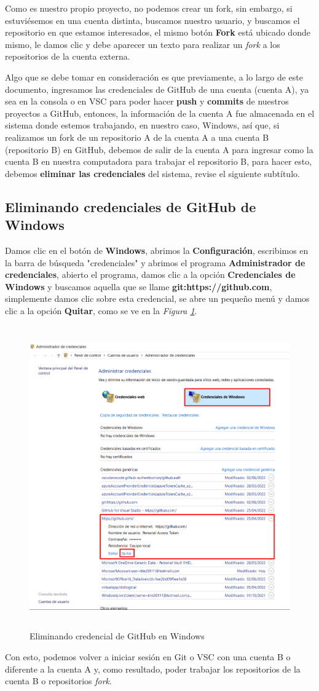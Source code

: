 Como es nuestro propio proyecto, no podemos crear un fork, sin embargo, si estuviésemos en una cuenta distinta, buscamos nuestro usuario, y buscamos el repositorio en que estamos interesados, el mismo botón \textbf{Fork} está ubicado donde mismo, le damos clic y debe aparecer un texto para realizar un \textit{fork} a los repositorios de la cuenta externa.

Algo que se debe tomar en consideración es que previamente, a lo largo de este documento, ingresamos las credenciales de GitHub de una cuenta (cuenta A), ya sea en la consola o en VSC para poder hacer \textbf{push} y \textbf{commits} de nuestros proyectos a GitHub, entonces, la información de la cuenta A fue almacenada en el sistema donde estemos trabajando, en nuestro caso, Windows, así que, si realizamos un fork de un repositorio A de la cuenta A a una cuenta B (repositorio B) en GitHub, debemos de salir de la cuenta A para ingresar como la cuenta B en nuestra computadora para trabajar el repositorio B, para hacer esto, debemos \textbf{eliminar las credenciales} del sistema, revise el siguiente subtítulo.


\subsection{Eliminando credenciales de GitHub de Windows}

Damos clic en el botón de \textbf{Windows}, abrimos la \textbf{Configuración}, escribimos en la barra de búsqueda "credenciales" y abrimos el programa \textbf{Administrador de credenciales}, abierto el programa, damos clic a la opción \textbf{Credenciales de Windows} y buscamos aquella que se llame \textbf{git:https://github.com}, simplemente damos clic sobre esta credencial, se abre un pequeño menú y damos clic a la opción \textbf{Quitar}, como se ve en la \textit{Figura \ref{fig: 38}}.
\begin{figure}[H]
    \centering
    \caption{Eliminando credencial de GitHub en Windows}
    \label{fig: 38}
    \includegraphics[height=13cm]{capturas/credencial.png}
\end{figure}

Con esto, podemos volver a iniciar sesión en Git o VSC con una cuenta B o diferente a la cuenta A y, como resultado, poder trabajar los repositorios de la cuenta B o repositorios \textit{fork}.
